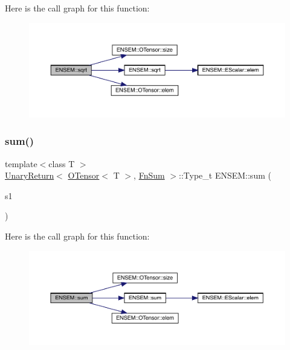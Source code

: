 Here is the call graph for this function\+:\nopagebreak
\begin{figure}[H]
\begin{center}
\leavevmode
\includegraphics[width=350pt]{de/d87/group__obstensor_gab4101323c19945bf42cbece4b0c2e8b4_cgraph}
\end{center}
\end{figure}
\mbox{\label{group__obstensor_ga83a9795df4ff312d25e7971ff02b5e8b}} 
\subsubsection{\texorpdfstring{sum()}{sum()}}
{\footnotesize\ttfamily template$<$class T $>$ \\
\mbox{\hyperlink{structENSEM_1_1UnaryReturn}{Unary\+Return}}$<$ \mbox{\hyperlink{classENSEM_1_1OTensor}{O\+Tensor}}$<$ T $>$, \mbox{\hyperlink{structENSEM_1_1FnSum}{Fn\+Sum}} $>$\+::Type\+\_\+t E\+N\+S\+E\+M\+::sum (\begin{DoxyParamCaption}\item[{const \mbox{\hyperlink{classENSEM_1_1OTensor}{O\+Tensor}}$<$ T $>$ \&}]{s1 }\end{DoxyParamCaption})\hspace{0.3cm}{\ttfamily [inline]}}

Here is the call graph for this function\+:\nopagebreak
\begin{figure}[H]
\begin{center}
\leavevmode
\includegraphics[width=350pt]{de/d87/group__obstensor_ga83a9795df4ff312d25e7971ff02b5e8b_cgraph}
\end{center}
\end{figure}
\mbox{\label{group__obstensor_gaaea33431d7f292c563a371d23c31eb07}} 
